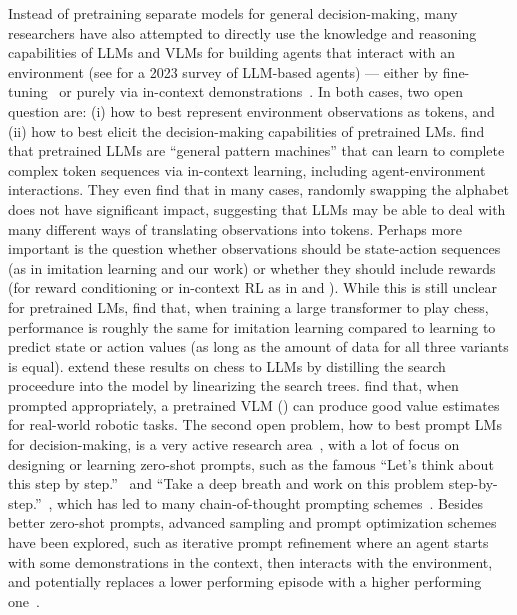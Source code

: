 Instead of pretraining separate models for general decision-making, many researchers have also attempted to directly use the knowledge and reasoning capabilities of LLMs and VLMs for building agents that interact with an environment (see \citet{xi2025rise} for a 2023 survey of LLM-based agents) --- either by fine-tuning~\citep{li2022pretrained} or purely via in-context demonstrations~\citep{dipalo2024keypoint}.
In both cases, two open question are: (i) how to best represent environment observations as tokens, and (ii) how to best elicit the decision-making capabilities of pretrained LMs.
\citet{mirchandani2023large} find that pretrained LLMs are ``general pattern machines'' that can learn to complete complex token sequences via in-context learning, including agent-environment interactions.
They even find that in many cases, randomly swapping the alphabet does not have significant impact, suggesting that LLMs may be able to deal with many different ways of translating observations into tokens.
Perhaps more important is the question whether observations should be state-action sequences (as in imitation learning and our work) or whether they should include rewards (for reward conditioning or in-context RL as in \citet{mirchandani2023large} and \citet{raparthy2024generalization}).
While this is still unclear for pretrained LMs, \citet{ruoss2024amortized} find that, when training a large transformer to play chess, performance is roughly the same for imitation learning compared to learning to predict state or action values (as long as the amount of data for all three variants is equal).
\citet{schultz2025mastering} extend these results on chess to LLMs by distilling the search proceedure into the model by linearizing the search trees.
\citet{ma2025vision} find that, when prompted appropriately, a pretrained VLM (\pro{}) can produce good value estimates for real-world robotic tasks.
The second open problem, how to best prompt LMs for decision-making, is a very active research area~\citep{li2025why,genewein2025understanding}, with a lot of focus on designing or learning zero-shot prompts, such as the famous ``Let's think about this step by step.''~\citep{kojima2022large} and ``Take a deep breath and work on this problem step-by-step.''~\citep{yang2024large}, which has led to many chain-of-thought prompting schemes~\citep{wei2022chain}.
Besides better zero-shot prompts, advanced sampling and prompt optimization schemes have been explored,
such as iterative prompt refinement where an agent starts with some demonstrations in the context, then interacts with the environment, and potentially replaces a lower performing episode with a higher performing one~\citep{mirchandani2023large, brooks2023large}. 

